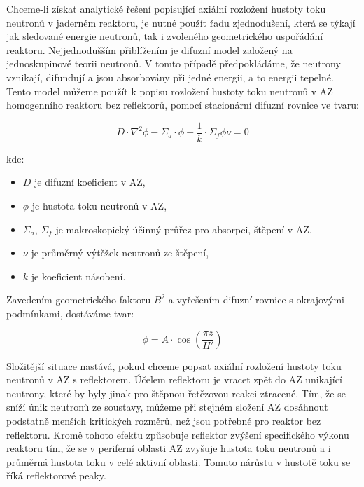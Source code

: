 Chceme-li získat analytické řešení popisující axiální rozložení hustoty toku neutronů v jaderném reaktoru, je nutné použít řadu zjednodušení, která se týkají jak sledované energie neutronů, tak i zvoleného geometrického uspořádání reaktoru. Nejjednodušším přiblížením je difuzní model založený na jednoskupinové teorii neutronů. V tomto případě předpokládáme, že neutrony vznikají, difundují a jsou absorbovány při jedné energii, a to energii tepelné. Tento model můžeme použít k popisu rozložení hustoty toku neutronů v AZ homogenního reaktoru bez reflektorů, pomocí stacionární difuzní rovnice ve tvaru:

\begin{equation*}
D \cdot \nabla^2 \phi - \Sigma_{a} \cdot \phi + \dfrac{1}{k} \cdot \Sigma_{f} \phi \nu= 0
\end{equation*}

kde:

\begin{itemize}
    \item $D$ je difuzní koeficient v AZ,
    \item $\phi$ je hustota toku neutronů v AZ,
    \item $\Sigma_{a}$, $\Sigma_{f}$ je makroskopický účinný průřez pro absorpci, štěpení v AZ,
    \item $\nu$ je průměrný výtěžek neutronů ze štěpení,
    \item $k$ je koeficient násobení.
\end{itemize}

Zavedením geometrického faktoru $B^2$ a vyřešením difuzní rovnice s okrajovými podmínkami, dostáváme tvar:

\begin{equation}
    \phi = A \cdot \cos{\left(\dfrac{\pi z}{H'}\right)}
\end{equation}

Složitější situace nastává, pokud chceme popsat axiální rozložení hustoty toku neutronů v AZ s reflektorem. Účelem reflektoru je vracet zpět do AZ unikající neutrony, které by byly jinak pro štěpnou řetězovou reakci ztracené. Tím, že se sníží únik neutronů ze soustavy, můžeme při stejném složení AZ dosáhnout podstatně menších kritických rozměrů, než jsou potřebné pro reaktor bez reflektoru. Kromě tohoto efektu způsobuje reflektor zvýšení specifického výkonu reaktoru tím, že se v periferní oblasti AZ zvyšuje hustota toku neutronů a i průměrná hustota toku v celé aktivní oblasti. Tomuto nárůstu v hustotě toku se říká reflektorové peaky.

